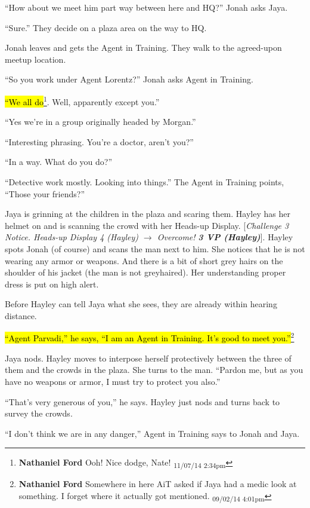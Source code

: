 ``How about we meet him part way between here and HQ?'' Jonah asks Jaya.

``Sure.''  They decide on a plaza area on the way to HQ.



Jonah leaves and gets the Agent in Training.  They walk to the agreed-upon meetup location.

``So you work under Agent Lorentz?'' Jonah asks Agent in Training.

\hl{``We all do}\footnote{\textbf{Nathaniel Ford }Ooh! Nice dodge, Nate! \textsubscript{11/07/14 2:34pm}}.  Well, apparently except you.''

``Yes we're in a group originally headed by Morgan.''

``Interesting phrasing.  You're a doctor, aren't you?''

``In a way.  What do you do?''

``Detective work mostly.  Looking into things.''  The Agent in Training points, ``Those your friends?''



Jaya is grinning at the children in the plaza and scaring them.  Hayley has her helmet on and is scanning the crowd with her Heads-up Display.  {[}\textit{Challenge 3 Notice.  Heads-up Display 4 (Hayley) $\rightarrow$ Overcome! }\textit{\textbf{3 VP (Hayley)}}{]}.  Hayley spots Jonah (of course) and scans the man next to him.  She notices that he is not wearing any armor or weapons.  And there is a bit of short grey hairs on the shoulder of his jacket (the man is not greyhaired).  Her understanding proper dress is put on high alert.



Before Hayley can tell Jaya what she sees, they are already within hearing distance.  

\hl{``Agent Parvadi,'' he says, ``I am an Agent in Training.  It's good to meet you.''}\footnote{\textbf{Nathaniel Ford }Somewhere in here AiT asked if Jaya had a medic look at something. I forget where it actually got mentioned. \textsubscript{09/02/14 4:01pm}}

Jaya nods.  Hayley moves to interpose herself protectively between the three of them and the crowds in the plaza.  She turns to the man.  ``Pardon me, but as you have no weapons or armor, I must try to protect you also.''

``That's very generous of you,'' he says.  Hayley just nods and turns back to survey the crowds.

``I don't think we are in any danger,'' Agent in Training says to Jonah and Jaya.

